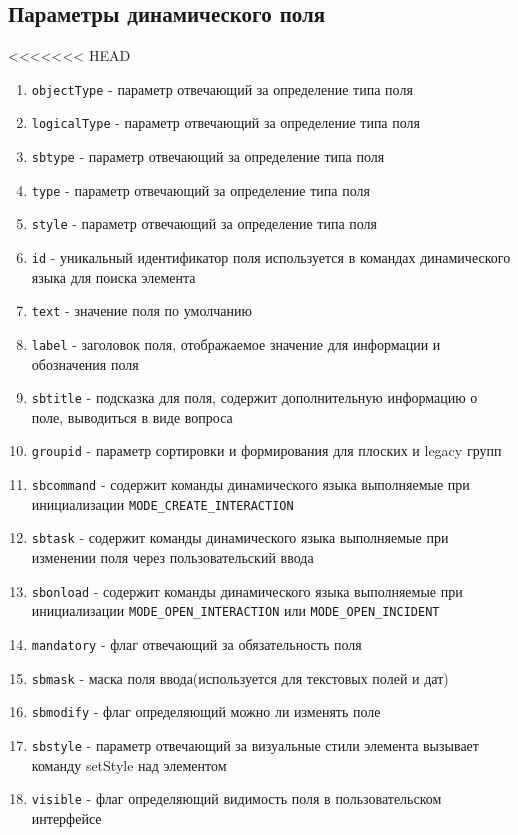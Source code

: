 \documentclass[../index.tex]{subfiles}
\begin{document}
\subsection{Параметры динамического поля}
<<<<<<< HEAD
\begin{enumerate}
    \item \verb|objectType| - параметр отвечающий за определение типа поля
    \item \verb|logicalType| - параметр отвечающий за определение типа поля
    \item \verb|sbtype| - параметр отвечающий за определение типа поля
    \item \verb|type| - параметр отвечающий за определение типа поля
    \item \verb|style| - параметр отвечающий за определение типа поля
    \item \verb|id| - уникальный идентификатор поля используется в командах динамического языка для поиска элемента
    \item \verb|text| - значение поля по умолчанию
    \item \verb|label| - заголовок поля, отображаемое значение для информации и обозначения поля
    \item \verb|sbtitle| - подсказка для поля, содержит дополнительную информацию о поле, выводиться в виде вопроса
    \item \verb|groupid| - параметр сортировки и формирования для плоских и legacy групп
    \item \verb|sbcommand| - содержит команды динамического языка выполняемые при инициализации \verb|MODE_CREATE_INTERACTION|
    \item \verb|sbtask| - содержит команды динамического языка выполняемые при изменении поля через пользовательский ввода
    \item \verb|sbonload| - содержит команды динамического языка выполняемые при инициализации \verb|MODE_OPEN_INTERACTION| или \verb|MODE_OPEN_INCIDENT|
    \item \verb|mandatory| - флаг отвечающий за обязательность поля
    \item \verb|sbmask| - маска поля ввода(используется для текстовых полей и дат)
    \item \verb|sbmodify| - флаг определяющий можно ли изменять поле
    \item \verb|sbstyle| - параметр отвечающий за визуальные стили элемента вызывает команду setStyle над элементом
    \item \verb|visible| - флаг определяющий видимость поля в пользовательском интерфейсе

\end{enumerate}
\end{document}
